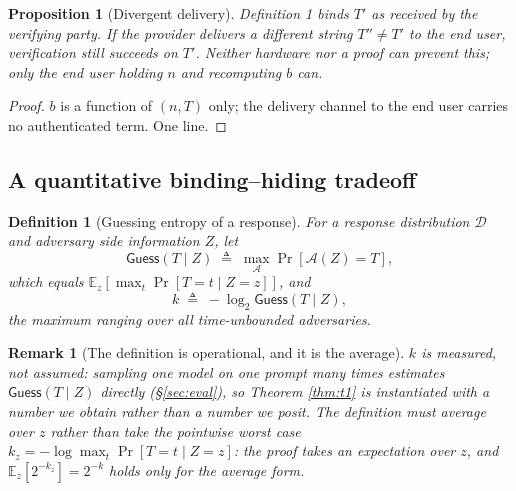 \documentclass[journal]{IEEEtran}
\newtheorem{proposition}[theorem]{Proposition}
\newtheorem{definition}[theorem]{Definition}
\newtheorem{remark}[theorem]{Remark}
\newcommand{\need}[1]{}
\newcommand{\fixme}[1]{}
\newcommand{\need}[1]{\textcolor{blue}{[[ NEED: #1 ]]}}
\newcommand{\fixme}[1]{\textcolor{orange}{[[ FIX: #1 ]]}}
\begin{document}
\fixme{\textbf{H3/H4}：早先写的 ``the relation contains no term referring to the
delivered bytes'' 与仓库事实冲突——公开值里\emph{已有} $b$，验证时由送达的
$T'$ 现场重算（\texttt{circuits/types/src/lib.rs:444}、
\texttt{docs/security-model.md:232}）。命题已按上面的定义改写。见
\texttt{docs/tdsc-fixlist.md} \S H。}

\begin{proposition}[Divergent delivery]
\label{thm:gap}
Definition 1 binds $T'$ \emph{as received by the verifying party}. If the
provider delivers a different string $T'' \ne T'$ to the end user, verification
still succeeds on $T'$. Neither hardware nor a proof can prevent this; only the
end user holding $n$ and recomputing $b$ can.
\end{proposition}
\begin{proof}
$b$ is a function of $(n,T)$ only; the delivery channel to the end user carries
no authenticated term. One line.
\end{proof}

\need{This is the \emph{residual} gap, not ``proofs bind nothing''. Prior work
must be cited here (Hollow-LLM \cite{hollowllm}, zk-attach \cite{zkattach}), and
we state plainly that the naive claim would be false against our own system.}

\subsection{A quantitative binding--hiding tradeoff}
\label{sec:tradeoff}

\begin{definition}[Guessing entropy of a response]
\label{def:k}
For a response distribution $\mathcal{D}$ and adversary side information $Z$,
let
\[
\mathsf{Guess}(T \mid Z) \;\triangleq\; \max_{\mathcal{A}} \Pr[\mathcal{A}(Z) = T],
\]
which equals $\mathbb{E}_z[\max_t \Pr[T = t \mid Z = z]]$, and
\[
k \;\triangleq\; -\log_2 \mathsf{Guess}(T \mid Z),
\]
the maximum ranging over all time-unbounded adversaries.
\end{definition}

\begin{remark}[The definition is operational, and it is the average]
\label{rem:kmeas}
$k$ is \emph{measured}, not assumed: sampling one model on one prompt many
times estimates $\mathsf{Guess}(T \mid Z)$ directly
(\S\ref{sec:eval}), so Theorem \ref{thm:t1} is instantiated with a
number we obtain rather than a number we posit. The definition must average
over $z$ rather than take the pointwise worst case
$k_z = -\log \max_t \Pr[T = t \mid Z = z]$: the proof takes an expectation over
$z$, and $\mathbb{E}_z[2^{-k_z}] = 2^{-k}$ holds only for the average form.
\end{remark}
\end{document}
